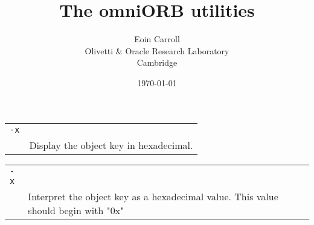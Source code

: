 \documentclass[twoside,11pt,onecolumn]{article}
\title{The omniORB utilities}
\author{Eoin Carroll\\ 
Olivetti \& Oracle Research Laboratory\\ 
Cambridge}
\date{\today}
\begin{document}
\pagestyle{empty}
{\newpage
\clearpage
\samepage \begin{tabular}{ll}
\verb.-x. \\ 
  & Display the object key in hexadecimal.
\end{tabular}
}

{\newpage
\clearpage
\samepage \begin{tabular}{ll}
\verb.-x. \\ 
 & Interpret the object key as a hexadecimal value. This 
value should begin with "0x"
\end{tabular}
}

\end{document}
